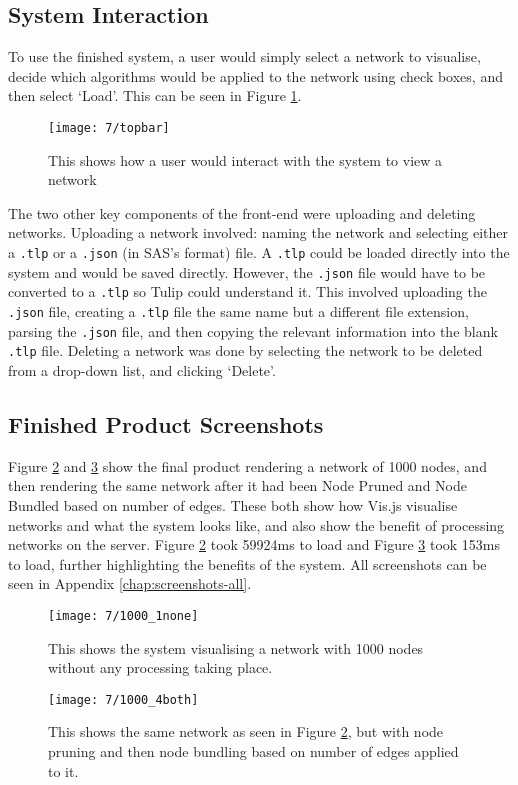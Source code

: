 \documentclass[../dissertation.tex]{subfiles}
\begin{document}
\subsection{System Interaction}

To use the finished system, a user would simply select a network to visualise, decide which algorithms would be applied to the network using check boxes, and then select `Load'. This can be seen in Figure \ref{fig:topbar}.

\begin{figure}[H]
    \centering
    \texttt{[image: 7/topbar]}
    \caption{This shows how a user would interact with the system to view a network}
    \label{fig:topbar}
\end{figure}

The two other key components of the front-end were uploading and deleting networks. Uploading a network involved: naming the network and selecting either a \texttt{.tlp} or a \texttt{.json} (in SAS's format) file. A \texttt{.tlp} could be loaded directly into the system and would be saved directly. However, the \texttt{.json} file would have to be converted to a \texttt{.tlp} so Tulip could understand it. This involved uploading the \texttt{.json} file, creating a \texttt{.tlp} file the same name but a different file extension, parsing the \texttt{.json} file, and then copying the relevant information into the blank \texttt{.tlp} file. Deleting a network was done by selecting the network to be deleted from a drop-down list, and clicking `Delete'.

\subsection{Finished Product Screenshots}

Figure \ref{fig:1000-none} and \ref{fig:1000-both} show the final product rendering a network of 1000 nodes, and then rendering the same network after it had been Node Pruned and Node Bundled based on number of edges. These both show how Vis.js visualise networks and what the system looks like, and also show the benefit of processing networks on the server. Figure \ref{fig:1000-none} took 59924ms to load and Figure \ref{fig:1000-both} took 153ms to load, further highlighting the benefits of the system. All screenshots can be seen in Appendix \ref{chap:screenshots-all}.

\begin{figure}[H]
    \centering
    \texttt{[image: 7/1000\_1none]}
    \caption{This shows the system visualising a network with 1000 nodes without any processing taking place.}
    \label{fig:1000-none}
\end{figure}

\begin{figure}[H]
    \centering
    \texttt{[image: 7/1000\_4both]}
    \caption{This shows the same network as seen in Figure \ref{fig:1000-none}, but with node pruning and then node bundling based on number of edges applied to it.}
    \label{fig:1000-both}
\end{figure}
\end{document}
